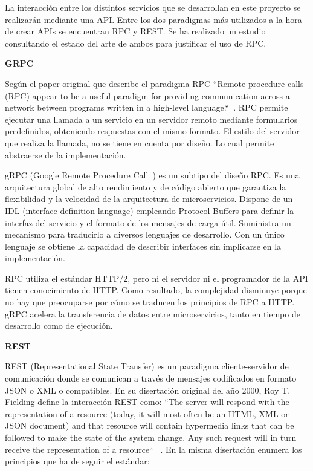 
La interacción entre los distintos servicios que se desarrollan en este proyecto se realizarán mediante una \gls{API}.
Entre los dos paradigmas más utilizados a la hora de crear APIs se encuentran RPC y REST\@.
Se ha realizado un estudio consultando el estado del arte de ambos para justificar el uso de RPC\@.

\textbf{GRPC}

Según el paper original que describe el paradigma RPC “Remote procedure calls (RPC) appear to be a useful paradigm for providing communication across a
network between programs written in a high-level language.“~\cite{Birrell198439}.
RPC permite ejecutar una llamada a un servicio en un servidor remoto mediante formularios predefinidos, obteniendo respuestas con el mismo formato.
El estilo del servidor que realiza la llamada, no se tiene en cuenta por diseño.
Lo cual permite abstraerse de la implementación.

gRPC (Google Remote Procedure Call~\cite{grpc}) es un subtipo del diseño RPC\@.
Es una arquitectura global de alto rendimiento y de código abierto que garantiza la flexibilidad y la velocidad de la arquitectura de microservicios.
Dispone de un \gls{IDL} (interface definition language) empleando Protocol Buffers para definir la interfaz del servicio y el formato de los mensajes de carga útil.
Suministra un mecanismo para traducirlo a diversos lenguajes de desarrollo.
Con un único lenguaje se obtiene la capacidad de describir interfaces sin implicarse en la implementación.

RPC utiliza el estándar HTTP/2, pero ni el servidor ni el programador de la API tienen conocimiento de HTTP. Como resultado, la complejidad disminuye porque no hay que preocuparse por cómo se traducen los principios de RPC a HTTP. gRPC acelera la transferencia de datos entre microservicios, tanto en tiempo de desarrollo como de ejecución.

\textbf{REST}

\gls{REST} (Representational State Transfer) es un paradigma cliente-servidor de comunicación donde se comunican a través de mensajes codificados en formato JSON o XML o compatibles.
En su disertación original del año 2000, Roy T. Fielding define la interacción REST como: “\ldot The server will respond with the representation of a resource (today, it will most often be an HTML, XML or JSON document) and that resource will contain hypermedia links that can be followed to make the state of the system change.
Any such request will in turn receive the representation of a resource\ldot “ ~\cite{FieldingRoyThomas2000Asat}.
En la misma disertación enumera los principios que ha de seguir el estándar:

